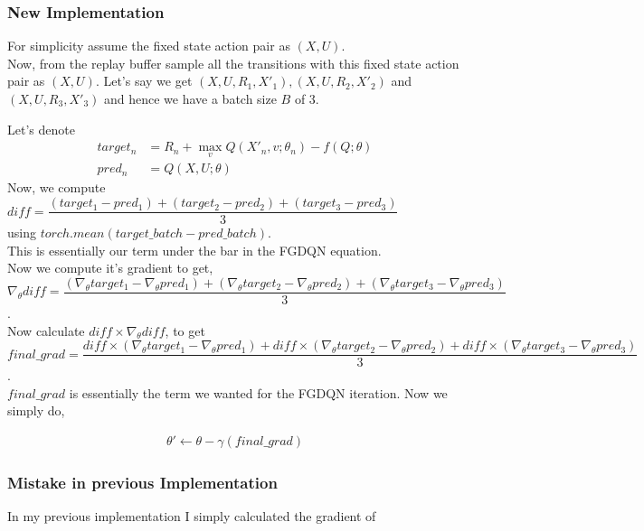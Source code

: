 \documentclass{article}
\theoremstyle{definition}
\begin{document}
\clearpage    
\subsubsection{New Implementation}
For simplicity assume the fixed state action pair as $(X,U)$. \\
Now, from the replay buffer sample all the transitions with this fixed state action pair as $(X,U)$. Let's say we get $(X,U,R_1,X'_1), (X,U,R_2,X'_2)$ and $(X,U,R_3,X'_3)$ and hence we have a batch size $B$ of 3.

Let's denote 
\begin{align*}
    target_n &= R_n +\max_v Q(X'_n, v; \theta_n) -f(Q;\theta) \\
    pred_n &= Q(X, U;\theta)
\end{align*}
Now, we compute $diff = \dfrac{(target_1-pred_1)+(target_2-pred_2)+(target_3-pred_3)}{3}$ \\using $torch.mean(target\_batch-pred\_batch)$.\\
This is essentially our term under the bar in the FGDQN equation.\\

Now we compute it's gradient to get,\\
$\nabla_\theta diff = \dfrac{(\nabla_\theta target_1-\nabla_\theta pred_1)+(\nabla_\theta target_2-\nabla_\theta pred_2)+(\nabla_\theta target_3-\nabla_\theta pred_3)}{3}$.\\

Now calculate $diff \times \nabla_\theta diff$, to get\\ 
$final\_grad = \dfrac{diff \times (\nabla_\theta target_1-\nabla_\theta pred_1)+diff \times (\nabla_\theta target_2-\nabla_\theta pred_2)+diff \times (\nabla_\theta target_3-\nabla_\theta pred_3)}{3}$.\\

$final\_grad$ is essentially the term we wanted for the FGDQN iteration. 
Now we simply do, 

\begin{align*}
\theta' \leftarrow \theta - \gamma(final\_grad)
\end{align*}


\subsubsection{Mistake in previous Implementation}
In my previous implementation I simply calculated the gradient of \\
\end{document}
